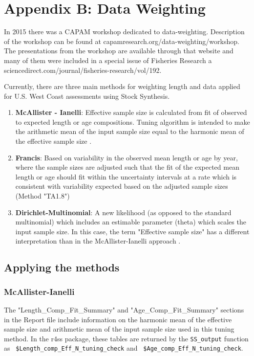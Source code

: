\section{Appendix B: Data Weighting}
\label{sec:DataWeight}

\begin{sloppypar}
In 2015 there was a CAPAM workshop dedicated to data-weighting. Description of the workshop can be found at capamresearch.org/data-weighting/workshop. The presentations from the workshop are available through that website and many of them were included in a special issue of Fisheries Research a sciencedirect.com/journal/fisheries-research/vol/192.
\end{sloppypar}

Currently, there are three main methods for weighting length and data applied for U.S. West Coast assessments using Stock Synthesis.

\begin{enumerate}
	\item \textbf{McAllister - Ianelli}: Effective sample size is calculated from fit of observed to expected length or age compositions. Tuning algorithm is intended to make the arithmetic mean of the input sample size equal to the harmonic mean of the effective sample size \citep{mcallister_bayesian_1997}.
	
	\item \textbf{Francis}: Based on variability in the observed mean length or age by year, where the sample sizes are adjusted such that the fit of the expected mean length or age should fit within the uncertainty intervals at a rate which is consistent with variability expected based on the adjusted sample sizes (Method "TA1.8") \citep{francis_data_2011}
	
	\item \textbf{Dirichlet-Multinomial}: A new likelihood (as opposed to the standard multinomial) which includes an estimable parameter (theta) which scales the input sample size. In this case, the term "Effective sample size" has a different interpretation than in the McAllister-Ianelli approach \citep{thorson_model-based_2017}.
\end{enumerate}

\subsection{Applying the methods}

\subsubsection{McAllister-Ianelli}
The "Length\_Comp\_Fit\_Summary" and "Age\_Comp\_Fit\_Summary" sections in the Report file include information on the harmonic mean of the effective sample size and arithmetic mean of the input sample size used in this tuning method. In the r4ss package, these tables are returned by the \texttt{SS\_output} function as \texttt{ \$Length\_comp\_Eff\_N\_tuning\_check} and \texttt{ \$Age\_comp\_Eff\_N\_tuning\_check}.

